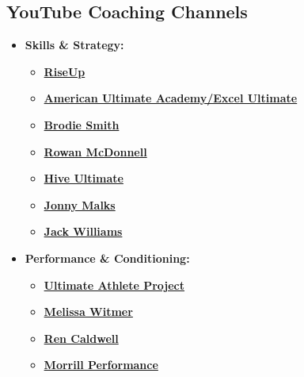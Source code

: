 \subsection*{YouTube Coaching Channels}
\begin{itemize}
    \item \textbf{Skills \& Strategy:}
    \begin{itemize}
        \item \textcolor{blue}{\textbf{\href{https://www.youtube.com/user/riseupultimate}{RiseUp}}}
        \item \textcolor{blue}{\textbf{\href{https://www.youtube.com/user/TeamRoxbury}{American Ultimate Academy/Excel Ultimate}}}
        \item \textcolor{blue}{\textbf{\href{https://www.youtube.com/watch?v=Trm\_XZR3dA0&list=PL9AFED79134CD79B8}{Brodie Smith}}}
        \item \textcolor{blue}{\textbf{\href{https://www.youtube.com/channel/UCRqlhwm5aYw9QJcFkDhBNdQ}{Rowan McDonnell}}}
        \item \textcolor{blue}{\textbf{\href{https://www.youtube.com/c/HiveUltimate}{Hive Ultimate}}}
        \item \textcolor{blue}{\textbf{\href{https://www.youtube.com/c/JonnyMalks/videos}{Jonny Malks}}}

        \item \textcolor{blue}{\textbf{\href{https://www.youtube.com/c/JackWilliams11}{Jack Williams}}}
    \end{itemize}
    \item \textbf{Performance \& Conditioning:}
    \begin{itemize}
        \item \textcolor{blue}{\textbf{\href{https://www.youtube.com/user/UltimateAP}{Ultimate Athlete Project}}}
        \item \textcolor{blue}{\textbf{\href{https://www.youtube.com/c/MelissaWitmer}{Melissa Witmer}}}
        \item \textcolor{blue}{\textbf{\href{https://www.youtube.com/user/renfitness/videos}{Ren Caldwell}}}
        \item \textcolor{blue}{\textbf{\href{https://www.youtube.com/user/morrillperformance/videos}{Morrill Performance}}} 
    \end{itemize}
\end{itemize}
